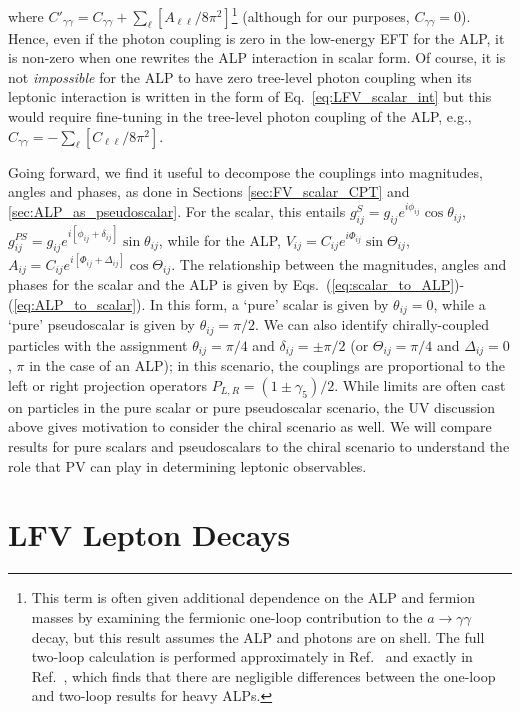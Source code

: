 where $C'_{\gamma\gamma} = C_{\gamma\gamma} + \sum_{\ell}[A_{\ell\ell}/8\pi^2]$\footnote{This term is often given additional dependence on the ALP and fermion masses by examining the fermionic one-loop contribution to the $a\rightarrow\gamma\gamma$ decay, but this result assumes the ALP and photons are on shell. The full two-loop calculation is performed approximately in Ref.~\cite{Buen-Abad:2021fwq} and exactly in Ref.~\cite{Neubert:2024jal}, which finds that there are negligible differences between the one-loop and two-loop results for heavy ALPs.} (although for our purposes, $C_{\gamma\gamma} = 0$). Hence, even if the photon coupling is zero in the low-energy EFT for the ALP, it is non-zero when one rewrites the ALP interaction in scalar form. Of course, it is not {\it impossible} for the ALP to have zero tree-level photon coupling when its leptonic interaction is written in the form of Eq.~\ref{eq:LFV_scalar_int} but this would require fine-tuning in the tree-level photon coupling of the ALP, e.g., $C_{\gamma\gamma} = -\sum_\ell[C_{\ell\ell}/8\pi^2]$.

Going forward, we find it useful to decompose the couplings into magnitudes, angles and phases, as done in Sections \ref{sec:FV_scalar_CPT} and \ref{sec:ALP_as_pseudoscalar}.  For the scalar, this entails $g_{ij}^S = g_{ij}e^{i\phi_{ij}}\cos{\theta_{ij}}$, $g_{ij}^{PS} = g_{ij}e^{i[\phi_{ij}+\delta_{ij}]}\sin{\theta_{ij}}$, while for the ALP, $V_{ij} = C_{ij}e^{i\Phi_{ij}}\sin{\Theta_{ij}}$, $A_{ij} = C_{ij}e^{i[\Phi_{ij} + \Delta_{ij}]}\cos{\Theta_{ij}}$. The relationship between the magnitudes, angles and phases for the scalar and the ALP is given by Eqs.~(\ref{eq:scalar_to_ALP})-(\ref{eq:ALP_to_scalar}). In this form, a `pure' scalar is given by $\theta_{ij} = 0$, while a `pure' pseudoscalar is given by $\theta_{ij} = \pi/2$. We can also identify chirally-coupled particles with the assignment $\theta_{ij} = \pi/4$ and $\delta_{ij} = \pm\pi/2$ (or $\Theta_{ij} = \pi/4$ and $\Delta_{ij} = 0$, $\pi$ in the case of an ALP); in this scenario, the couplings are proportional to the left or right projection operators $P_{L,R} = (1 \pm \gamma_5)/2$. While limits are often cast on particles in the pure scalar or pure pseudoscalar scenario, the UV discussion above gives motivation to consider the chiral scenario as well. We will compare results for pure scalars and pseudoscalars to the chiral scenario to understand the role that PV can play in determining leptonic observables.

\section{LFV Lepton Decays}\label{sec:lfv_decays}

